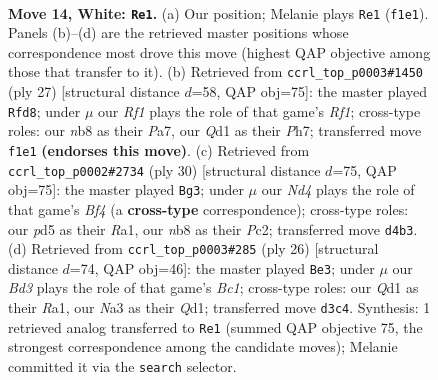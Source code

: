\documentclass[11pt]{article}
\begin{document}
\clearpage

\begin{figure}[p]\centering
\begin{subfigure}{0.46\textwidth}\centering
\resizebox{\linewidth}{!}{%
\newchessgame
\chessboard[
  setfen={rn4k1/pp2rppp/3bbq2/3p4/3N4/N2B4/PPP2PPP/R2Q1RK1 w - - 1 14},
  showmover=false,
  pgfstyle=straightmove, color=movearrow, markmove={f1-e1}
]}
\caption{}
\end{subfigure}\hfill
\begin{subfigure}{0.46\textwidth}\centering
\resizebox{\linewidth}{!}{%
\newchessgame
\chessboard[
  setfen={r4rk1/pp1qbppp/2b1pn2/8/3B4/2P2B2/PP1NQPPP/R2R2K1 b - - 8 14},
  showmover=false,
  pgfstyle=straightmove, color=movearrow, markmove={f8-d8}
]}
\caption{}
\end{subfigure}
\\[4pt]
\begin{subfigure}{0.46\textwidth}\centering
\resizebox{\linewidth}{!}{%
\newchessgame
\chessboard[
  setfen={r1b2rk1/pp3pp1/2n2q1p/2bp4/5B2/2PB1N2/P1PQ1PPP/R3R1K1 w - - 0 16},
  showmover=false,
  pgfstyle=straightmove, color=movearrow, markmove={f4-g3}
]}
\caption{}
\end{subfigure}\hfill
\begin{subfigure}{0.46\textwidth}\centering
\resizebox{\linewidth}{!}{%
\newchessgame
\chessboard[
  setfen={r1bq1rk1/1pp2pp1/5n1p/p3b3/N7/P5P1/1P2PPBP/R1BQ1RK1 w - - 0 14},
  showmover=false,
  pgfstyle=straightmove, color=movearrow, markmove={c1-e3}
]}
\caption{}
\end{subfigure}
\caption{\textbf{Move 14, White: \texttt{Re1}.} (a) Our position; Melanie plays \texttt{Re1} (\texttt{f1e1}). Panels (b)--(d) are the retrieved master positions whose correspondence most drove this move (highest QAP objective among those that transfer to it). (b) Retrieved from \texttt{ccrl\_top\_p0003\#1450} (ply 27) [structural distance $d$=58, QAP obj=75]: the master played \texttt{Rfd8}; under $\mu$ our \emph{Rf1} plays the role of that game's \emph{Rf1}; cross-type roles: our \emph{n}b8 as their \emph{P}a7, our \emph{Q}d1 as their \emph{P}h7; transferred move \texttt{f1e1} \textbf{(endorses this move)}. (c) Retrieved from \texttt{ccrl\_top\_p0002\#2734} (ply 30) [structural distance $d$=75, QAP obj=75]: the master played \texttt{Bg3}; under $\mu$ our \emph{Nd4} plays the role of that game's \emph{Bf4} (a \textbf{cross-type} correspondence); cross-type roles: our \emph{p}d5 as their \emph{R}a1, our \emph{n}b8 as their \emph{P}c2; transferred move \texttt{d4b3}. (d) Retrieved from \texttt{ccrl\_top\_p0003\#285} (ply 26) [structural distance $d$=74, QAP obj=46]: the master played \texttt{Be3}; under $\mu$ our \emph{Bd3} plays the role of that game's \emph{Bc1}; cross-type roles: our \emph{Q}d1 as their \emph{R}a1, our \emph{N}a3 as their \emph{Q}d1; transferred move \texttt{d3c4}. Synthesis: 1 retrieved analog transferred to \texttt{Re1} (summed QAP objective 75, the strongest correspondence among the candidate moves); Melanie committed it via the \texttt{search} selector.}
\label{fig:thought-m26}
\end{figure}
\end{document}
